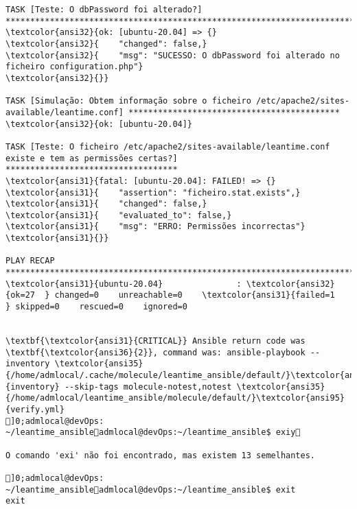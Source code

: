 \documentclass{scrartcl}
\begin{document}
\begin{Verbatim}
TASK [Teste: O dbPassword foi alterado?] *************************************************************************************************
\textcolor{ansi32}{ok: [ubuntu-20.04] => {}
\textcolor{ansi32}{    "changed": false,}
\textcolor{ansi32}{    "msg": "SUCESSO: O dbPassword foi alterado no ficheiro configuration.php"}
\textcolor{ansi32}{}}

TASK [Simulação: Obtem informação sobre o ficheiro /etc/apache2/sites-available/leantime.conf] *******************************************
\textcolor{ansi32}{ok: [ubuntu-20.04]}

TASK [Teste: O ficheiro /etc/apache2/sites-available/leantime.conf existe e tem as permissões certas?] ***********************************
\textcolor{ansi31}{fatal: [ubuntu-20.04]: FAILED! => {}
\textcolor{ansi31}{    "assertion": "ficheiro.stat.exists",}
\textcolor{ansi31}{    "changed": false,}
\textcolor{ansi31}{    "evaluated_to": false,}
\textcolor{ansi31}{    "msg": "ERRO: Permissões incorrectas"}
\textcolor{ansi31}{}}

PLAY RECAP *******************************************************************************************************************************
\textcolor{ansi31}{ubuntu-20.04}               : \textcolor{ansi32}{ok=27  } changed=0    unreachable=0    \textcolor{ansi31}{failed=1   } skipped=0    rescued=0    ignored=0


\textbf{\textcolor{ansi31}{CRITICAL}} Ansible return code was \textbf{\textcolor{ansi36}{2}}, command was: ansible-playbook --inventory \textcolor{ansi35}{/home/admlocal/.cache/molecule/leantime_ansible/default/}\textcolor{ansi95}{inventory} --skip-tags molecule-notest,notest \textcolor{ansi35}{/home/admlocal/leantime_ansible/molecule/default/}\textcolor{ansi95}{verify.yml}
]0;admlocal@devOps: ~/leantime_ansibleadmlocal@devOps:~/leantime_ansible$ exiy

O comando 'exi' não foi encontrado, mas existem 13 semelhantes.

]0;admlocal@devOps: ~/leantime_ansibleadmlocal@devOps:~/leantime_ansible$ exit
exit

\end{Verbatim}
\end{document}
